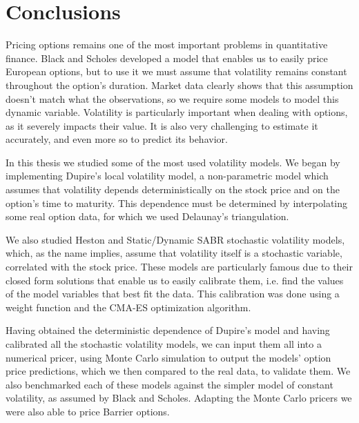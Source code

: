 
\chapter{Conclusions}
\label{chapter:conclusions}
Pricing options remains one of the most important problems in quantitative finance. Black and Scholes developed a model that enables us to easily price European options, but to use it we must assume that volatility remains constant throughout the option's duration.
Market data clearly shows that this assumption doesn't match what the observations, so we require some models to model this dynamic variable.
Volatility is particularly important when dealing with options, as it severely impacts their value. It is also very challenging to estimate it accurately, and even more so to predict its behavior.

In this thesis we studied some of the most used volatility models.
We began by implementing Dupire's local volatility model, a non-parametric model which assumes that volatility depends deterministically on the stock price and on the option's time to maturity. This dependence must be determined by interpolating some real option data, for which we used Delaunay's triangulation.

We also studied Heston and Static/Dynamic SABR stochastic volatility models, which, as the name implies, assume that volatility itself is a stochastic variable, correlated with the stock price. These models are particularly famous due to their closed form solutions that enable us to easily calibrate them, i.e. find the values of the model variables that best fit the data. This calibration was done using a weight function and the CMA-ES optimization algorithm.

Having obtained the deterministic dependence of Dupire's model and having calibrated all the stochastic volatility models, we can input them all into a numerical pricer, using Monte Carlo simulation to output the models' option price predictions, which we then compared to the real data, to validate them. We also benchmarked each of these models against the simpler model of constant volatility, as assumed by Black and Scholes.
Adapting the Monte Carlo pricers we were also able to price Barrier options.

